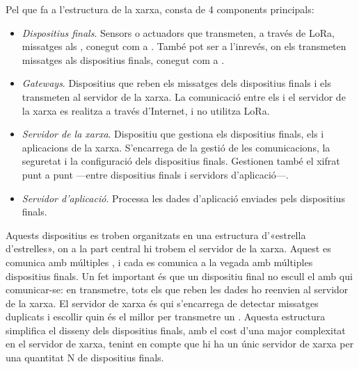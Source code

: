 \documentclass{tfgitic}[2024/07/01]
\begin{document}
Pel que fa a l'estructura de la xarxa, consta de 4 components principals:
\begin{itemize}
    \item \emph{Dispositius finals}. Sensors o actuadors que transmeten, a través de LoRa, missatges als , conegut com a . També pot ser a l'inrevés, on els  transmeten missatges als dispositius finals, conegut com a .  
    \item \emph{Gateways}. Dispositius que reben els missatges dels dispositius finals i els transmeten al servidor de la xarxa. La comunicació entre els  i el servidor de la xarxa es realitza a través d'Internet, i no utilitza LoRa. 
    \item \emph{Servidor de la xarxa}. Dispositiu que gestiona els dispositius finals, els  i aplicacions de la xarxa. S'encarrega de la gestió de les comunicacions, la seguretat i la configuració dels dispositius finals. Gestionen també el xifrat punt a punt ---entre dispositius finals i servidors d'aplicació---.
    \item \emph{Servidor d'aplicació}. Processa les dades d'aplicació enviades pels dispositius finals.
\end{itemize}
Aquests dispositius es troben organitzats en una estructura d'«estrella d'estrelles», on a la part central hi trobem el servidor de la xarxa. Aquest es comunica amb múltiples , i cada  es comunica a la vegada amb múltiples dispositius finals. 
Un fet important és que un dispositiu final no escull el  amb qui comunicar-se: en transmetre, tots els  que reben les dades ho reenvien al servidor de la xarxa. El servidor de xarxa és qui s'encarrega de detectar missatges duplicats i escollir quin és el millor  per transmetre un . Aquesta estructura simplifica el disseny dels dispositius finals, amb el cost d'una major complexitat en el servidor de xarxa, tenint en compte que hi ha un únic servidor de xarxa per una quantitat N de dispositius finals.
\end{document}
